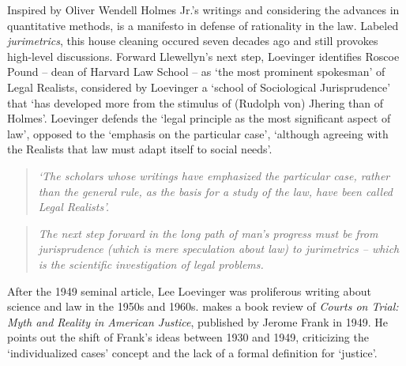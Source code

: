 \documentclass[a4paper]{exam}
\theoremstyle{plain}
\begin{document}
Inspired by Oliver Wendell Holmes Jr.'s writings and considering the advances in quantitative methods, \cite{loevinger1949jurimetrics} is a manifesto in defense of rationality in the law. Labeled \textit{jurimetrics}, this house cleaning occured seven decades ago and still provokes high-level discussions. Forward Llewellyn's next step, Loevinger identifies Roscoe Pound -- dean of Harvard Law School -- as `the most prominent spokesman' of Legal Realists, considered by Loevinger a `school of Sociological Jurisprudence' that `has developed more from the stimulus of (Rudolph von) Jhering than of Holmes'. Loevinger defends the `legal principle as the most significant aspect of law', opposed to the `emphasis on the particular case', `although agreeing with the Realists that law must adapt itself to social needs'.
\begin{quote}
\textit{`The scholars whose writings have emphasized the particular case, rather than the general rule, as the basis for a study of the law, have been called Legal Realists'.} \cite[p. 10]{loevinger1949jurimetrics}
\end{quote}

\begin{quote}
\textit{The next step forward in the long path of man's progress must be from jurisprudence (which is mere speculation about law) to jurimetrics -- which is the scientific investigation of legal problems.} \cite[p. 31]{loevinger1949jurimetrics}
\end{quote}

After the 1949 seminal article, Lee Loevinger was proliferous writing about science and law in the 1950s and 1960s. \cite{loevinger1950semantics} makes a book review of \textit{Courts on Trial: Myth and Reality in American Justice}, published by Jerome Frank in 1949. He points out the shift of Frank's ideas between 1930 and 1949, criticizing the `individualized cases' concept and the lack of a formal definition for `justice'. 
\end{document}
